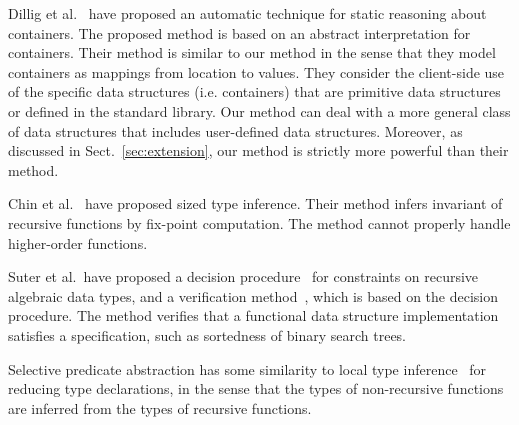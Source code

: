 Dillig et al.~\cite{Dillig2011} have proposed an automatic technique for
static reasoning about containers.  The proposed method is based on an
abstract interpretation for containers.  Their method is similar to our
method in the sense that they model containers as mappings from location
to values.  They consider the client-side use of the specific data
structures (i.e. containers) that are primitive data structures or
defined in the standard library.  Our method can deal with a more
general class of data structures that includes user-defined data
structures.  Moreover, as discussed in Sect.~\ref{sec:extension}, our
method is strictly more powerful than their method.

Chin et al.~\cite{Chin2003} have proposed sized type inference.  Their
method infers invariant of recursive functions by fix-point computation.
The method cannot properly handle higher-order functions.

Suter et al.~have proposed a decision procedure~\cite{Suter2010} for
constraints on recursive algebraic data types, and a verification
method~\cite{Suter2011}, which is based on the
decision procedure.  The method verifies that a functional data
structure implementation satisfies a specification, such as sortedness
of binary search trees.

Selective predicate abstraction has some similarity to local type
inference~\cite{Pierce2000} for reducing type declarations, in the sense
that the types of non-recursive functions are inferred from the types of
recursive functions.
